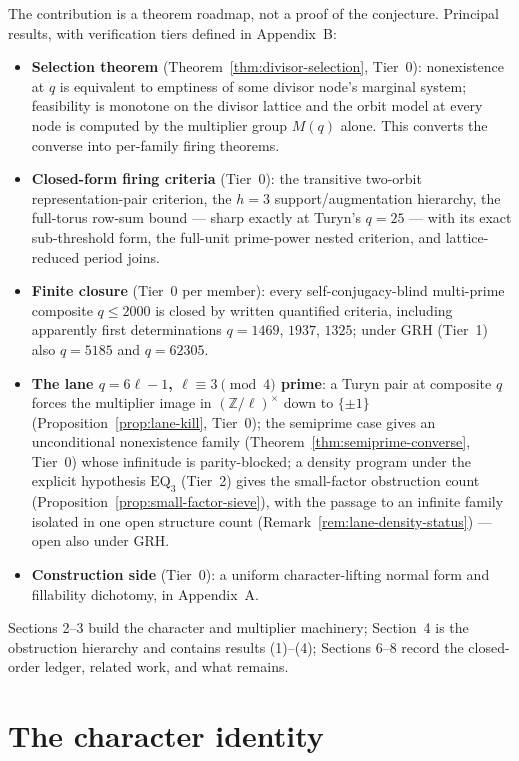 \documentclass[11pt]{article}
\theoremstyle{plain}
\theoremstyle{definition}
\theoremstyle{remark}
\newcommand{\Z}{\mathbb Z}
\begin{document}
The contribution is a theorem roadmap, not a proof of the conjecture.
Principal results, with verification tiers defined in Appendix~B:
\begin{itemize}
\item[(1)] \textbf{Selection theorem} (Theorem~\ref{thm:divisor-selection},
  Tier~0): nonexistence at $q$ is equivalent to emptiness of some divisor
  node's marginal system; feasibility is monotone on the divisor lattice
  and the orbit model at every node is computed by the multiplier group
  $M(q)$ alone. This converts the converse into per-family firing theorems.
\item[(2)] \textbf{Closed-form firing criteria} (Tier~0): the transitive
  two-orbit representation-pair criterion, the $h=3$
  support/augmentation hierarchy, the full-torus row-sum bound --- sharp
  exactly at Turyn's $q=25$ --- with its exact sub-threshold form, the
  full-unit prime-power nested criterion, and lattice-reduced period
  joins.
\item[(3)] \textbf{Finite closure} (Tier~0 per member): every
  self-conjugacy-blind multi-prime composite $q\le2000$ is closed by
  written quantified criteria, including apparently first determinations
  $q=1469$, $1937$, $1325$; under GRH (Tier~1) also $q=5185$ and
  $q=62305$.
\item[(4)] \textbf{The lane $q=6\ell-1$, $\ell\equiv3\pmod4$ prime}: a
  Turyn pair at composite $q$ forces the multiplier image in
  $(\Z/\ell)^\times$ down to $\{\pm1\}$
  (Proposition~\ref{prop:lane-kill}, Tier~0); the semiprime case gives an
  unconditional nonexistence family
  (Theorem~\ref{thm:semiprime-converse}, Tier~0) whose infinitude is
  parity-blocked; a density program under the explicit hypothesis
  $\mathrm{EQ}_3$ (Tier~2) gives the small-factor obstruction count
  (Proposition~\ref{prop:small-factor-sieve}), with the passage to an
  infinite family isolated in one open structure count
  (Remark~\ref{rem:lane-density-status}) --- open also under GRH.
\item[(5)] \textbf{Construction side} (Tier~0): a uniform
  character-lifting normal form and fillability dichotomy, in
  Appendix~A.
\end{itemize}
Sections 2--3 build the character and multiplier machinery; Section~4 is
the obstruction hierarchy and contains results (1)--(4); Sections 6--8
record the closed-order ledger, related work, and what remains.

\section{The character identity}\label{sec:character}
\end{document}
